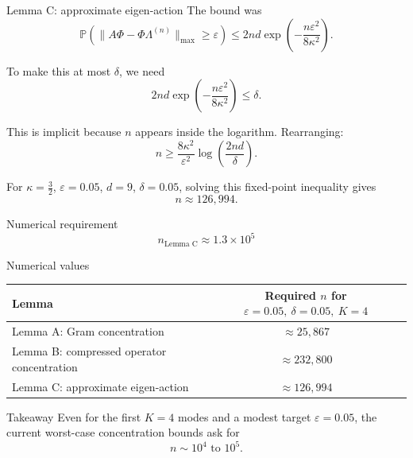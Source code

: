 \documentclass[10pt,aspectratio=169]{beamer}
\begin{document}
\begin{frame}{Lemma C: approximate eigen-action}
	\small
	The bound was
	\[
		\mathbb P\!\left(\|A\Phi-\Phi\Lambda^{(n)}\|_{\max}\ge \varepsilon\right)
		\le 2nd\exp\!\left(-\frac{n\varepsilon^2}{8\kappa^2}\right).
	\]

	To make this at most \(\delta\), we need
	\[
		2nd\exp\!\left(-\frac{n\varepsilon^2}{8\kappa^2}\right)\le \delta.
	\]

	This is implicit because \(n\) appears inside the logarithm. Rearranging:
	\[
		\boxed{
			n \ge \frac{8\kappa^2}{\varepsilon^2}\log\!\left(\frac{2nd}{\delta}\right).
		}
	\]

	For \(\kappa=\frac32\), \(\varepsilon=0.05\), \(d=9\), \(\delta=0.05\), solving this fixed-point inequality gives
	\[
		n \approx 126{,}994.
	\]

	\begin{block}{Numerical requirement}
		\[
			\boxed{n_{\text{Lemma C}} \approx 1.3\times 10^5}
		\]
	\end{block}

\end{frame}

\begin{frame}{Numerical values}
	\small
	\begin{table}
		\centering
		\begin{tabular}{l c}
			\hline
			\textbf{Lemma}                             & \textbf{Required \(n\) for \(\varepsilon=0.05,\ \delta=0.05,\ K=4\)} \\
			\hline
			Lemma A: Gram concentration                & \( \approx 25{,}867\)                                                \\
			Lemma B: compressed operator concentration & \( \approx 232{,}800\)                                               \\
			Lemma C: approximate eigen-action          & \( \approx 126{,}994\)                                               \\
			\hline
		\end{tabular}
	\end{table}

	\begin{block}{Takeaway}
		Even for the first \(K=4\) modes and a modest target \(\varepsilon=0.05\), the current worst-case concentration bounds ask for
		\[
			n \sim 10^4 \text{ to } 10^5.
		\]
	\end{block}

\end{frame}
\end{document}
